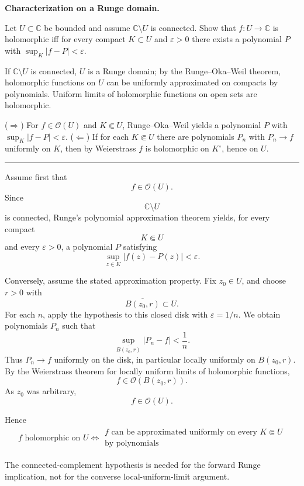 \begin{problem}[CP-II-0549]
\label{prob:cp-ii-0549}
\textbf{Characterization on a Runge domain.}

\hspace*{1.5em}Let $U\subset\mathbb C$ be bounded and assume $\mathbb C\setminus U$ is connected.
Show that $f:U\to\mathbb C$ is holomorphic iff for every compact $K\subset U$ and $\varepsilon>0$
there exists a polynomial $P$ with $\sup_{K}|f-P|<\varepsilon$.

If $\mathbb C\setminus U$ is connected, $U$ is a Runge domain; by the
Runge--Oka--Weil theorem, holomorphic functions on $U$ can be uniformly approximated on compacts
by polynomials. Uniform limits of holomorphic functions on open sets are holomorphic.

($\Rightarrow$) For $f\in\mathcal O(U)$ and $K\Subset U$, Runge--Oka--Weil yields a polynomial $P$
with $\sup_{K}|f-P|<\varepsilon$.
($\Leftarrow$) If for each $K\Subset U$ there are polynomials $P_n$ with $P_n\to f$ uniformly on $K$,
then by Weierstrass $f$ is holomorphic on $K^\circ$, hence on $U$.

\noindent\rule{\textwidth}{0.4pt}

\bigskip
\end{problem}

\begin{solution}
Assume first that
\[
f\in\mathcal O(U).
\]
Since
\[
\mathbb C\setminus U
\]
is connected, Runge's polynomial approximation theorem yields, for every compact
\[
K\Subset U
\]
and every \(\varepsilon>0\), a polynomial \(P\) satisfying
\[
\sup_{z\in K}|f(z)-P(z)|<\varepsilon.
\]

Conversely, assume the stated approximation property. Fix \(z_0\in U\), and choose \(r>0\)
with
\[
\overline{B(z_0,r)}\subset U.
\]
For each \(n\), apply the hypothesis to this closed disk with \(\varepsilon=1/n\). We obtain
polynomials \(P_n\) such that
\[
\sup_{\overline{B(z_0,r)}}|P_n-f|<\frac1n.
\]
Thus \(P_n\to f\) uniformly on the disk, in particular locally uniformly on
\(B(z_0,r)\). By the Weierstrass theorem for locally uniform limits of holomorphic
functions,
\[
f\in\mathcal O(B(z_0,r)).
\]
As \(z_0\) was arbitrary,
\[
f\in\mathcal O(U).
\]

Hence
\[
\boxed{\begin{gathered}
f\text{ holomorphic on }U
\iff
\begin{gathered}
f\text{ can be approximated uniformly on every }K\Subset U\\
\text{by polynomials}
\end{gathered}
\end{gathered}}
\]

The connected-complement hypothesis is needed for the forward Runge implication, not for
the converse local-uniform-limit argument.
\end{solution}


